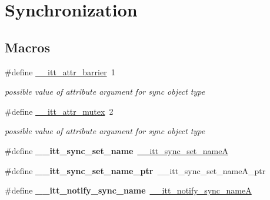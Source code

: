 \hypertarget{group__legacy__sync}{}\section{Synchronization}
\label{group__legacy__sync}
\subsection*{Macros}
\begin{DoxyCompactItemize}
\item 
\hypertarget{group__legacy__sync_gaa2de2b08cecad1d567b5312c503ad217}{}\#define \hyperlink{group__legacy__sync_gaa2de2b08cecad1d567b5312c503ad217}{\+\_\+\+\_\+itt\+\_\+attr\+\_\+barrier}~1\label{group__legacy__sync_gaa2de2b08cecad1d567b5312c503ad217}

\begin{DoxyCompactList}\small\item\em possible value of attribute argument for sync object type \end{DoxyCompactList}\item 
\hypertarget{group__legacy__sync_ga8c78a4fc23e9e2ed0f3d19cd92c7a60d}{}\#define \hyperlink{group__legacy__sync_ga8c78a4fc23e9e2ed0f3d19cd92c7a60d}{\+\_\+\+\_\+itt\+\_\+attr\+\_\+mutex}~2\label{group__legacy__sync_ga8c78a4fc23e9e2ed0f3d19cd92c7a60d}

\begin{DoxyCompactList}\small\item\em possible value of attribute argument for sync object type \end{DoxyCompactList}\item 
\hypertarget{group__legacy__sync_gac12bf88c486ee4c22a9b96fde51c642f}{}\#define {\bfseries \+\_\+\+\_\+itt\+\_\+sync\+\_\+set\+\_\+name}~\hyperlink{group__legacy__sync_ga8e63e2fa02de5df802490554d8ff0a41}{\+\_\+\+\_\+itt\+\_\+sync\+\_\+set\+\_\+name\+A}\label{group__legacy__sync_gac12bf88c486ee4c22a9b96fde51c642f}

\item 
\hypertarget{group__legacy__sync_gab78bffdbce7f664ea5f9ebe516870966}{}\#define {\bfseries \+\_\+\+\_\+itt\+\_\+sync\+\_\+set\+\_\+name\+\_\+ptr}~\+\_\+\+\_\+itt\+\_\+sync\+\_\+set\+\_\+name\+A\+\_\+ptr\label{group__legacy__sync_gab78bffdbce7f664ea5f9ebe516870966}

\item 
\hypertarget{group__legacy__sync_ga9b2bad86cdf5af6dec15777096fad3e1}{}\#define {\bfseries \+\_\+\+\_\+itt\+\_\+notify\+\_\+sync\+\_\+name}~\hyperlink{group__legacy__sync_gaa9a3eba5828bf261c60fc84e23c98ae1}{\+\_\+\+\_\+itt\+\_\+notify\+\_\+sync\+\_\+name\+A}\label{group__legacy__sync_ga9b2bad86cdf5af6dec15777096fad3e1}

\end{DoxyCompactItemize}
